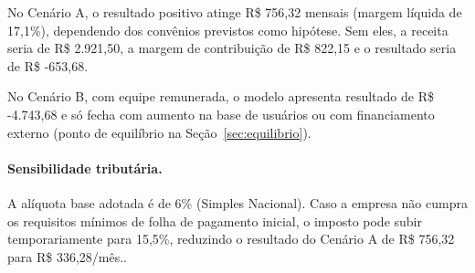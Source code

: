 No Cenário A, o resultado positivo atinge R\$ 756,32 mensais (margem líquida de 17,1\%), dependendo dos convênios previstos como hipótese. Sem eles, a receita seria de R\$ 2.921,50, a margem de contribuição de R\$ 822,15 e o resultado seria de R\$ -653,68.

No Cenário B, com equipe remunerada, o modelo apresenta resultado de R\$ -4.743,68 e só fecha com aumento na base de usuários ou com financiamento externo (ponto de equilíbrio na Seção~\ref{sec:equilibrio}).

\paragraph{Sensibilidade tributária.}
A alíquota base adotada é de 6\% (Simples Nacional). Caso a empresa não cumpra os requisitos mínimos de folha de pagamento inicial, o imposto pode subir temporariamente para 15,5\%, reduzindo o resultado do Cenário A de R\$ 756,32 para R\$ 336,28/mês..